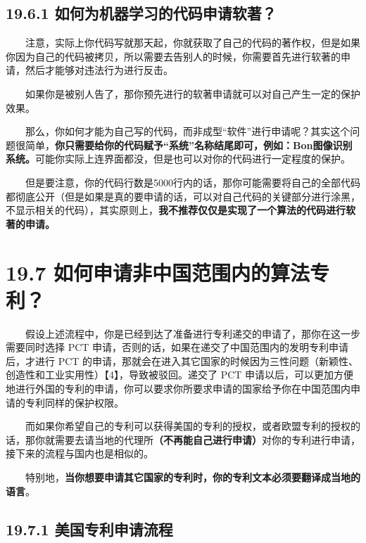 \subsection{19.6.1
如何为机器学习的代码申请软著？}\label{ux5982ux4f55ux4e3aux673aux5668ux5b66ux4e60ux7684ux4ee3ux7801ux7533ux8bf7ux8f6fux8457}

  注意，实际上你代码写就那天起，你就获取了自己的代码的著作权，但是如果你因为自己的代码被拷贝，所以需要去告别人的时候，你需要首先进行软著的申请，然后才能够对违法行为进行反击。

  如果你是被别人告了，那你预先进行的软著申请就可以对自己产生一定的保护效果。

  那么，你如何才能为自己写的代码，而非成型``软件''进行申请呢？其实这个问题很简单，\textbf{你只需要给你的代码赋予``系统''名称结尾即可，例如：Bon图像识别系统。}可能你实际上连界面都没，但是也可以对你的代码进行一定程度的保护。

  但是要注意，你的代码行数是5000行内的话，那你可能需要将自己的全部代码都彻底公开（但是如果是真的要申请的话，可以对自己代码的关键部分进行涂黑，不显示相关的代码），其实原则上，\textbf{我不推荐仅仅是实现了一个算法的代码进行软著的申请。}

\section{19.7
如何申请非中国范围内的算法专利？}\label{ux5982ux4f55ux7533ux8bf7ux975eux4e2dux56fdux8303ux56f4ux5185ux7684ux7b97ux6cd5ux4e13ux5229}

  假设上述流程中，你是已经到达了准备进行专利递交的申请了，那你在这一步需要同时选择
PCT 申请，否则的话，如果在递交了中国范围内的发明专利申请后，才进行 PCT
的申请，那就会在进入其它国家的时候因为三性问题（新颖性、创造性和工业实用性）【4】，导致被驳回。递交了
PCT
申请以后，可以更加方便地进行外国的专利的申请，你可以要求你所要求申请的国家给予你在中国范围内申请的专利同样的保护权限。

  而如果你希望自己的专利可以获得美国的专利的授权，或者欧盟专利的授权的话，那你就需要去请当地的代理所\textbf{（不再能自己进行申请）}对你的专利进行申请，接下来的流程与国内也是相似的。

  特别地，\textbf{当你想要申请其它国家的专利时，你的专利文本必须要翻译成当地的语言}。

\subsection{19.7.1
美国专利申请流程}\label{ux7f8eux56fdux4e13ux5229ux7533ux8bf7ux6d41ux7a0b}

